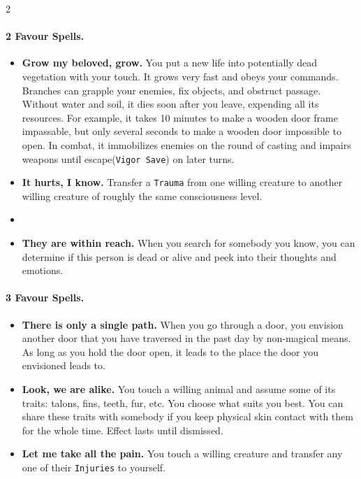 \begin{multicols*}{2}
\paragraph{2 Favour Spells.}

\begin{itemize}[nosep, leftmargin=*]
    
    \item[\ding{108}] \textbf{Grow my beloved, grow.} You put a new life into potentially dead vegetation with your touch.
 It grows very fast and obeys your commands.
 Branches can grapple your enemies, fix objects, and obstruct passage.
 Without water and soil, it dies soon after you leave, expending all its resources.
 For example, it takes 10 minutes to make a wooden door frame impassable, but only several seconds to make a wooden door impossible to open.
 In combat, it immobilizes enemies on the round of casting and impairs weapons until escape(\texttt{Vigor Save}) on later turns.
    \item[\ding{108}] \textbf{It hurts, I know.} Transfer a \texttt{Trauma} from one willing creature to another willing creature of roughly the same consciousness level.
    \item[] \item[\ding{108}] \textbf{They are within reach.} When you search for somebody you know, you can determine if this person is dead or alive and peek into their thoughts and emotions.
\end{itemize}

\paragraph{3 Favour Spells.}

\begin{itemize}[nosep, leftmargin=*]
    \item[\ding{108}] \textbf{There is only a single path.} When you go through a door, you envision another door that you have traversed in the past day by non-magical means.
    As long as you hold the door open, it leads to the place the door you envisioned leads to. 
    \item[\ding{108}] \textbf{Look, we are alike.} You touch a willing animal and assume some of its traits: talons, fins, teeth, fur, etc. You choose what suits you best.
 You can share these traits with somebody if you keep physical skin contact with them for the whole time.
 Effect lasts until dismissed.
    \item[\ding{108}] \textbf{Let me take all the pain.} You touch a willing creature and transfer any one of their \texttt{Injuries} to yourself.
\end{itemize}


\end{multicols*}
